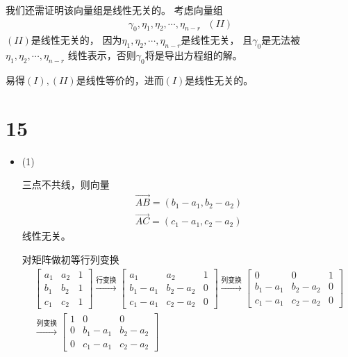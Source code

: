 \documentclass{article}
\begin{document}
我们还需证明该向量组是线性无关的。
考虑向量组
\begin{align*}
  \gamma_0, \eta_1, \eta_2, \cdots, \eta_{n - r} \ \ \ (II)
\end{align*}
$(II)$是线性无关的，
因为$\eta_1, \eta_2, \cdots, \eta_{n - r}$是线性无关，
且$\gamma_0$是无法被$\eta_1, \eta_2, \cdots, \eta_{n - r}$
线性表示，否则$\gamma_0$将是导出方程组的解。

易得$(I), (II)$是线性等价的，进而$(I)$是线性无关的。

\section*{15}

\begin{itemize}
  \item (1)

        三点不共线，则向量
        \begin{align*}
          \overrightarrow{AB} = (b_1 - a_1, b_2 - a_2) \\
          \overrightarrow{AC} = (c_1 - a_1, c_2 - a_2)
        \end{align*}
        线性无关。

        对矩阵做初等行列变换
        \begin{align*}
          \begin{bmatrix}
            a_1 & a_2 & 1 \\
            b_1 & b_2 & 1 \\
            c_1 & c_2 & 1
          \end{bmatrix}
          \xrightarrow{\text{行变换}}
          \begin{bmatrix}
            a_1       & a_2       & 1 \\
            b_1 - a_1 & b_2 - a_2 & 0 \\
            c_1 - a_1 & c_2 - a_2 & 0
          \end{bmatrix}
          \xrightarrow{\text{列变换}}
          \begin{bmatrix}
            0         & 0         & 1 \\
            b_1 - a_1 & b_2 - a_2 & 0 \\
            c_1 - a_1 & c_2 - a_2 & 0
          \end{bmatrix} \\
          \xrightarrow{\text{列变换}}
          \begin{bmatrix}
            1 & 0         & 0         \\
            0 & b_1 - a_1 & b_2 - a_2 \\
            0 & c_1 - a_1 & c_2 - a_2
          \end{bmatrix}
        \end{align*}


\end{itemize}
\end{document}
